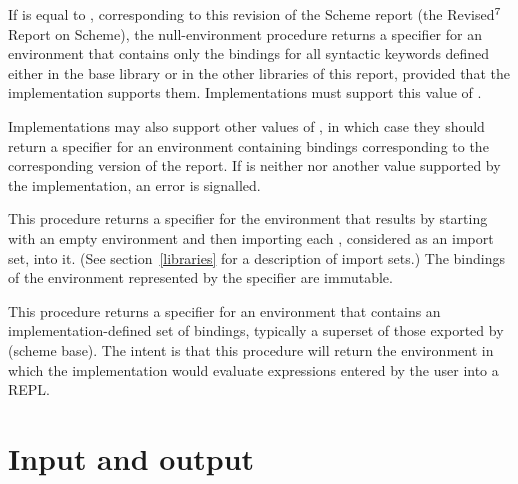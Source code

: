 \begin{entry}{%
}

If  is equal to {\cf \integerversion},
corresponding to this revision of the Scheme report (the
Revised$^7$ Report on Scheme),
the {\cf null-environment} procedure returns
a specifier for an environment that contains only the
bindings for all syntactic keywords
defined either in the base library or in the other libraries
of this report, provided that the implementation supports them.
Implementations must support this value of .

Implementations may also support other values of , in which
case they should return a specifier for an environment containing bindings corresponding to the corresponding version of the report.
If 
is neither {\cf \integerversion} nor another value supported by
the implementation, an error is signalled.

\end{entry}

\begin{entry}{%
}

This procedure returns a specifier for the environment that results by
starting with an empty environment and then importing each ,
considered as an import set, into it.  (See section~\ref{libraries} for
a description of import sets.)  The bindings of the environment
represented by the specifier are immutable.

\end{entry}

\begin{entry}{%
}

This procedure returns a specifier for an environment that contains an
imple\-men\-ta\-tion-defined set of bindings, typically a superset of
those exported by {\cf(scheme base)}.  The intent is that this procedure
will return the environment in which the implementation would evaluate
expressions entered by the user into a REPL.

\end{entry}

\section{Input and output}

